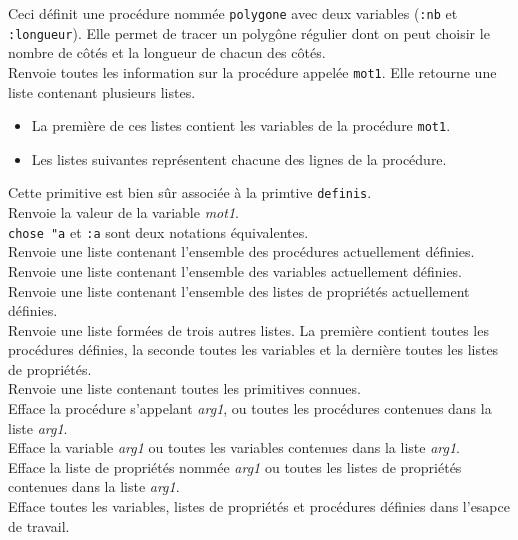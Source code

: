 Ceci définit une procédure nommée \texttt{polygone} avec deux variables (\texttt{:nb} et \texttt{:longueur}). Elle permet de tracer un polygône régulier dont on peut choisir le nombre de côtés et la longueur de chacun des côtés. \\
Renvoie toutes les information sur la procédure appelée \texttt{mot1}. Elle retourne une liste contenant plusieurs listes.
\begin{itemize}
 \item La première de ces listes contient les variables de la procédure \texttt{mot1}.
 \item Les listes suivantes représentent chacune des lignes de la procédure.
\end{itemize}
Cette primitive est bien sûr associée à la primtive \texttt{definis}.\\
 Renvoie la valeur de la variable \textit{mot1}.\\
 \texttt{chose "a} et \texttt{:a} sont deux notations équivalentes.\\
Renvoie une liste contenant l'ensemble des procédures actuellement définies.\\
Renvoie une liste contenant l'ensemble des variables actuellement définies.\\
Renvoie une liste contenant l'ensemble des listes de propriétés actuellement définies.\\
Renvoie une liste formées de trois autres listes. La première contient toutes les procédures définies, la seconde toutes les variables et la dernière toutes les listes de propriétés.\\
Renvoie une liste contenant toutes les primitives connues.\\
Efface la procédure s'appelant \textit{arg1}, ou toutes les procédures contenues dans la liste \textit{arg1}.\\
Efface la variable \textit{arg1} ou toutes les variables contenues dans la liste \textit{arg1}.\\
Efface la liste de propriétés nommée \textit{arg1} ou toutes les listes de propriétés contenues dans la liste \textit{arg1}.\\
Efface toutes les variables, listes de propriétés et procédures définies dans l'esapce de travail.\\
